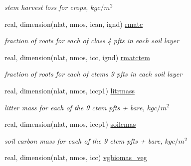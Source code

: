 \begin{DoxyCompactItemize}
\begin{DoxyCompactList}\small\item\em stem harvest loss for crops, $kg c/m^2$ \end{DoxyCompactList}\item 
\hypertarget{structctem__statevars_1_1veg__rot_a0af3281bc1b954ff934e7776995dc3c5}{}real, dimension(nlat, nmos, ican, ignd) \hyperlink{structctem__statevars_1_1veg__rot_a0af3281bc1b954ff934e7776995dc3c5}{rmatc}\label{structctem__statevars_1_1veg__rot_a0af3281bc1b954ff934e7776995dc3c5}

\begin{DoxyCompactList}\small\item\em fraction of roots for each of class\textquotesingle{} 4 pfts in each soil layer \end{DoxyCompactList}\item 
\hypertarget{structctem__statevars_1_1veg__rot_ae4329fea98593110342ac80618b65efe}{}real, dimension(nlat, nmos, icc, ignd) \hyperlink{structctem__statevars_1_1veg__rot_ae4329fea98593110342ac80618b65efe}{rmatctem}\label{structctem__statevars_1_1veg__rot_ae4329fea98593110342ac80618b65efe}

\begin{DoxyCompactList}\small\item\em fraction of roots for each of ctem\textquotesingle{}s 9 pfts in each soil layer \end{DoxyCompactList}\item 
\hypertarget{structctem__statevars_1_1veg__rot_af1bf861d8430d04b7a438e9c049340ba}{}real, dimension(nlat, nmos, iccp1) \hyperlink{structctem__statevars_1_1veg__rot_af1bf861d8430d04b7a438e9c049340ba}{litrmass}\label{structctem__statevars_1_1veg__rot_af1bf861d8430d04b7a438e9c049340ba}

\begin{DoxyCompactList}\small\item\em litter mass for each of the 9 ctem pfts + bare, $kg c/m^2$ \end{DoxyCompactList}\item 
\hypertarget{structctem__statevars_1_1veg__rot_af05e33f8557bb5363e7840de4b53b97f}{}real, dimension(nlat, nmos, iccp1) \hyperlink{structctem__statevars_1_1veg__rot_af05e33f8557bb5363e7840de4b53b97f}{soilcmas}\label{structctem__statevars_1_1veg__rot_af05e33f8557bb5363e7840de4b53b97f}

\begin{DoxyCompactList}\small\item\em soil carbon mass for each of the 9 ctem pfts + bare, $kg c/m^2$ \end{DoxyCompactList}\item 
\hypertarget{structctem__statevars_1_1veg__rot_a3874623379920bd56cf537fdb11ccc72}{}real, dimension(nlat, nmos, icc) \hyperlink{structctem__statevars_1_1veg__rot_a3874623379920bd56cf537fdb11ccc72}{vgbiomas\+\_\+veg}\label{structctem__statevars_1_1veg__rot_a3874623379920bd56cf537fdb11ccc72}


\end{DoxyCompactItemize}
